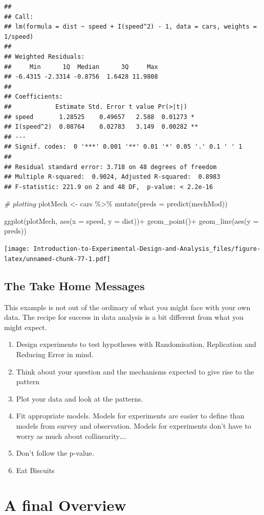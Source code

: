 \documentclass[
]{book}
\newenvironment{Shaded}{\begin{snugshade}}{\end{snugshade}}
\newcommand{\AttributeTok}[1]{\textcolor[rgb]{0.77,0.63,0.00}{#1}}
\newcommand{\CommentTok}[1]{\textcolor[rgb]{0.56,0.35,0.01}{\textit{#1}}}
\newcommand{\FunctionTok}[1]{\textcolor[rgb]{0.00,0.00,0.00}{#1}}
\newcommand{\NormalTok}[1]{#1}
\newcommand{\OtherTok}[1]{\textcolor[rgb]{0.56,0.35,0.01}{#1}}
\newcommand{\SpecialCharTok}[1]{\textcolor[rgb]{0.00,0.00,0.00}{#1}}
\providecommand{\tightlist}{%
  \setlength{\itemsep}{0pt}\setlength{\parskip}{0pt}}
\begin{document}
\begin{verbatim}
## 
## Call:
## lm(formula = dist ~ speed + I(speed^2) - 1, data = cars, weights = 1/speed)
## 
## Weighted Residuals:
##     Min      1Q  Median      3Q     Max 
## -6.4315 -2.3314 -0.8756  1.6428 11.9808 
## 
## Coefficients:
##            Estimate Std. Error t value Pr(>|t|)   
## speed       1.28525    0.49657   2.588  0.01273 * 
## I(speed^2)  0.08764    0.02783   3.149  0.00282 **
## ---
## Signif. codes:  0 '***' 0.001 '**' 0.01 '*' 0.05 '.' 0.1 ' ' 1
## 
## Residual standard error: 3.718 on 48 degrees of freedom
## Multiple R-squared:  0.9024, Adjusted R-squared:  0.8983 
## F-statistic: 221.9 on 2 and 48 DF,  p-value: < 2.2e-16
\end{verbatim}

\begin{Shaded}
\begin{Highlighting}[]
\CommentTok{\# plotting}
\NormalTok{plotMech }\OtherTok{\textless{}{-}}\NormalTok{ cars }\SpecialCharTok{\%\textgreater{}\%} 
  \FunctionTok{mutate}\NormalTok{(}\AttributeTok{preds =} \FunctionTok{predict}\NormalTok{(mechMod))}

\FunctionTok{ggplot}\NormalTok{(plotMech, }\FunctionTok{aes}\NormalTok{(}\AttributeTok{x =}\NormalTok{ speed, }\AttributeTok{y =}\NormalTok{ dist))}\SpecialCharTok{+}
  \FunctionTok{geom\_point}\NormalTok{()}\SpecialCharTok{+}
  \FunctionTok{geom\_line}\NormalTok{(}\FunctionTok{aes}\NormalTok{(}\AttributeTok{y =}\NormalTok{ preds))}
\end{Highlighting}
\end{Shaded}

\texttt{[image: Introduction-to-Experimental-Design-and-Analysis\_files/figure-latex/unnamed-chunk-77-1.pdf]}

\hypertarget{the-take-home-messages}{%
\section{The Take Home Messages}\label{the-take-home-messages}}

This example is not out of the ordinary of what you might face with your own data. The recipe for success in data analysis is a bit different from what you might expect.

\begin{enumerate}
\def\labelenumi{\arabic{enumi}.}
\tightlist
\item
  Design experiments to test hypotheses with Randomisation, Replication and Reducing Error in mind.
\item
  Think about your question and the mechanisms expected to give rise to the pattern
\item
  Plot your data and look at the patterns.
\item
  Fit appropriate models. Models for experiments are easier to define than models from survey and observation. Models for experiments don't have to worry as much about collinearity\ldots.
\item
  Don't follow the p-value.
\item
  Eat Biscuits
\end{enumerate}

\hypertarget{a-final-overview}{%
\chapter{A final Overview}\label{a-final-overview}}

  
\end{document}
